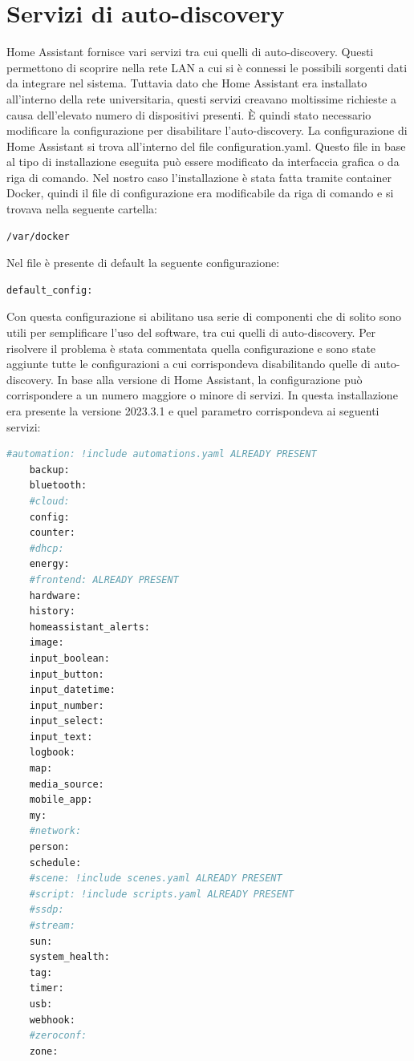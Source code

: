 \section{Servizi di auto-discovery}
\label{sec:hass-servizi}
Home Assistant fornisce vari servizi tra cui quelli di auto-discovery.
Questi permettono di scoprire nella rete LAN a cui si è connessi le possibili sorgenti dati da integrare nel sistema.
Tuttavia dato che Home Assistant era installato all'interno della rete universitaria,
questi servizi creavano moltissime richieste a causa dell'elevato numero di dispositivi presenti.
È quindi stato necessario modificare la configurazione per disabilitare l'auto-discovery.
La configurazione di Home Assistant si trova all'interno del file configuration.yaml.
Questo file in base al tipo di installazione eseguita può essere modificato da interfaccia grafica o
da riga di comando.
Nel nostro caso l'installazione è stata fatta tramite container Docker, 
quindi il file di configurazione era modificabile da riga di comando e si trovava nella seguente cartella:
\begin{lstlisting}[language=textnonum]
    /var/docker
\end{lstlisting}
Nel file è presente di default la seguente configurazione:
\begin{lstlisting}[language=textnonum]
    default_config:
\end{lstlisting}
Con questa configurazione si abilitano usa serie di componenti che di solito sono utili per semplificare l'uso
del software, tra cui quelli di auto-discovery.
Per risolvere il problema è stata commentata quella configurazione 
e sono state aggiunte tutte le configurazioni a cui corrispondeva disabilitando quelle di auto-discovery.
In base alla versione di Home Assistant, 
la configurazione può corrispondere a un numero maggiore o minore di servizi.
In questa installazione era presente la versione 2023.3.1 
e quel parametro corrispondeva ai seguenti servizi:
\begin{lstlisting}[language=bash]
    #automation: !include automations.yaml ALREADY PRESENT 
    backup:
    bluetooth:
    #cloud:
    config:
    counter:
    #dhcp:
    energy:
    #frontend: ALREADY PRESENT 
    hardware:
    history:
    homeassistant_alerts:
    image:
    input_boolean:
    input_button:
    input_datetime:
    input_number:
    input_select:
    input_text:
    logbook:
    map:
    media_source:
    mobile_app:
    my:
    #network:
    person:
    schedule:
    #scene: !include scenes.yaml ALREADY PRESENT 
    #script: !include scripts.yaml ALREADY PRESENT 
    #ssdp:
    #stream:
    sun:
    system_health:
    tag:
    timer:
    usb:
    webhook:
    #zeroconf:
    zone:
\end{lstlisting}
